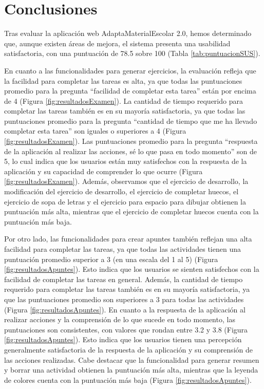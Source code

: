 \section{Conclusiones}\label{sec:conclusionesEvaluacion}
Tras evaluar la aplicación web AdaptaMaterialEscolar 2.0, hemos determinado que, aunque existen áreas de mejora, el sistema presenta una usabilidad satisfactoria, con una puntuación de 78.5 sobre 100 (Tabla \ref{tab:puntuacionSUS}).

En cuanto a las funcionalidades para generar ejercicios, la evaluación refleja que la facilidad para completar las tareas es alta, ya que todas las puntuaciones promedio para la pregunta ``facilidad de completar esta tarea'' están por encima de 4 (Figura \ref{fig:resultadosExamen}). La cantidad de tiempo requerido para completar las tareas también es en su mayoría satisfactoria, ya que todas las puntuaciones promedio para la pregunta ``cantidad de tiempo que me ha llevado completar esta tarea'' son iguales o superiores a 4 (Figura \ref{fig:resultadosExamen}). Las puntuaciones promedio para la pregunta ``respuesta de la aplicación al realizar las acciones, sé lo que pasa en todo momento'' son de 5, lo cual indica que los usuarios están muy satisfechos con la respuesta de la aplicación y su capacidad de comprender lo que ocurre (Figura \ref{fig:resultadosExamen}). Además, observamos que el ejercicio de desarrollo, la modificación del ejercicio de desarrollo, el ejercicio de completar huecos, el ejercicio de sopa de letras y el ejercicio para espacio para dibujar obtienen la puntuación más alta, mientras que el ejercicio de completar huecos cuenta con la puntuación más baja.

Por otro lado, las funcionalidades para crear apuntes también reflejan una alta facilidad para completar las tareas, ya que todas las actividades tienen una puntuación promedio superior a 3 (en una escala del 1 al 5) (Figura \ref{fig:resultadosApuntes}). Esto indica que los usuarios se sienten satisfechos con la facilidad de completar las tareas en general. Además, la cantidad de tiempo requerido para completar las tareas también es en su mayoría satisfactoria, ya que las puntuaciones promedio son superiores a 3 para todas las actividades (Figura \ref{fig:resultadosApuntes}). En cuanto a la respuesta de la aplicación al realizar acciones y la comprensión de lo que sucede en todo momento, las puntuaciones son consistentes, con valores que rondan entre 3.2 y 3.8 (Figura \ref{fig:resultadosApuntes}). Esto indica que los usuarios tienen una percepción generalmente satisfactoria de la respuesta de la aplicación y su comprensión de las acciones realizadas. Cabe destacar que la funcionalidad para generar resumen y borrar una actividad obtienen la puntuación más alta, mientras que la leyenda de colores cuenta con la puntuación más baja (Figura \ref{fig:resultadosApuntes}).

